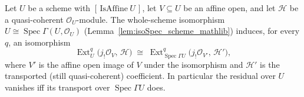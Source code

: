 \begin{lemma}
  \label{lem:modules_isoSpec_ext_transport}
  Let \(U\) be a scheme with \([\,\mathrm{IsAffine}\ U\,]\), let \(V \subseteq U\) be an affine open,
  and let \(\mathcal{H}\) be a quasi-coherent \(\mathcal{O}_U\)-module. The whole-scheme isomorphism
  \(U \cong \operatorname{Spec}\Gamma(U, \mathcal{O}_U)\) (Lemma~\ref{lem:isoSpec_scheme_mathlib})
  induces, for every \(q\), an isomorphism
  \[
    \operatorname{Ext}^q_{U}\bigl(j_!\mathcal{O}_V,\, \mathcal{H}\bigr)
      \;\cong\;
    \operatorname{Ext}^q_{\operatorname{Spec}\Gamma U}\bigl(j_!\mathcal{O}_{V'},\, \mathcal{H}'\bigr),
  \]
  where \(V'\) is the affine open image of \(V\) under the isomorphism and \(\mathcal{H}'\) is the
  transported (still quasi-coherent) coefficient. In particular the residual over \(U\) vanishes iff
  its transport over \(\operatorname{Spec}\Gamma U\) does.
\end{lemma}
